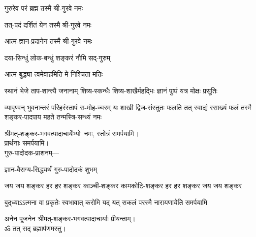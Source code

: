 \begin{center}
{गुरुरेव परं ब्रह्म तस्मै श्री-गुरवे नमः}

{तत्-पदं दर्शितं येन तस्मै श्री-गुरवे नमः}

{आत्म-ज्ञान-प्रदानेन तस्मै श्री-गुरवे नमः}

{दया-सिन्धुं लोक-बन्धुं शङ्करं नौमि सद्-गुरुम्}

{आत्म-बुद्ध्या त्वमेवाहमिति मे निश्चिता मतिः}

{स्थानं भेजे ताप-शान्त्यै जनानाम्}
{शिष्य-स्कन्धैः शिष्य-शाखैर्महद्भिः}
{ज्ञानं पुष्पं यत्र मोक्षः प्रसूतिः}

{व्यावृण्वन् भुवनान्तरं परिहरंस्तापं स-मोह-ज्वरम्}
{यः शाखी द्विज-संस्तुतः फलति तत् स्वाद्यं रसाख्यं फलं}
{तस्मै शङ्कर-पादपाय महते तन्मस्त्रि-सन्ध्यं नमः}

श्रीमत्-शङ्कर-भगवत्पादाचार्येभ्यो~नमः, स्तोत्रं समर्पयामि।\\

प्रार्थनाः समर्पयामि।\\

{गुरु-पादोदक-प्राशनम्\textsf{---}\hfill}

{ज्ञान-वैराग्य-सिद्ध्यर्थं गुरु-पादोदकं शुभम्}

\closesection







{जय जय शङ्कर हर हर शङ्कर}
{काञ्ची-शङ्कर कामकोटि-शङ्कर}
{हर हर शङ्कर जय जय शङ्कर}

{बुद्‌ध्याऽऽत्मना वा प्रकृतेः स्वभावात्}
{करोमि यद् यत् सकलं परस्मै}
{नारायणायेति समर्पयामि}

अनेन पूजनेन श्रीमत्-शङ्कर-भगवत्पादाचार्याः प्रीयन्ताम्। \\

ॐ तत् सद् ब्रह्मार्पणमस्तु।

\closesection





\end{center}
\closesection

